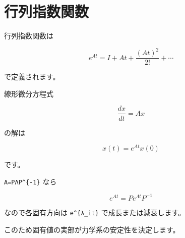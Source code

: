 \documentclass[
  11pt,
  a4paper,
]{ltjsarticle}
\author{}
\date{}
\begin{document}
\hypertarget{ux884cux5217ux6307ux6570ux95a2ux6570}{%
\section{行列指数関数}\label{ux884cux5217ux6307ux6570ux95a2ux6570}}

行列指数関数は

\[
e^{At}=I+At+\frac{(At)^2}{2!}+\cdots
\]

で定義されます。

線形微分方程式

\[
\frac{dx}{dt}=Ax
\]

の解は

\[
x(t)=e^{At}x(0)
\]

です。

\texttt{A=PΛP\^{}\{-1\}} なら

\[
e^{At}=Pe^{\Lambda t}P^{-1}
\]

なので各固有方向は \texttt{e\^{}\{λ\_it\}} で成長または減衰します。

このため固有値の実部が力学系の安定性を決定します。
\end{document}
